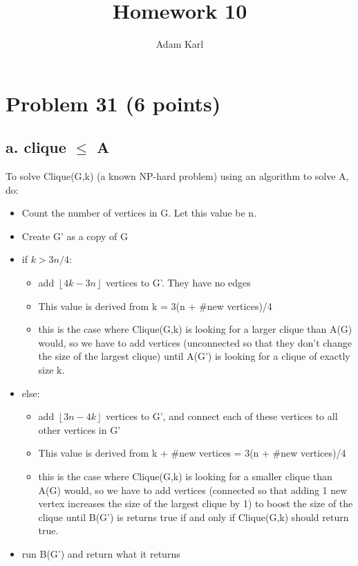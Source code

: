 \documentclass[a4paper]{article}
\title{Homework 10}
\author{Adam Karl}
\begin{document}
\maketitle

\section{Problem 31 (6 points)}
\subsection{a. clique $\leq$ A}
To solve Clique(G,k) (a known NP-hard problem) using an algorithm to solve A, do:

\begin{itemize}
    \item Count the number of vertices in G. Let this value be n.
    
    \item Create G' as a copy of G
    
    \item if $k > 3n/4$:
    \begin{itemize}
        \item add $\left\lfloor4k-3n\right\rfloor$ vertices to G'. They have no edges
        \item This value is derived from k = 3(n + #new vertices)/4
        \item this is the case where Clique(G,k) is looking for a larger clique than A(G) would, so we have to add vertices (unconnected so that they don't change the size of the largest clique) until A(G') is looking for a clique of exactly size k.
    \end{itemize}
    
    \item else:
    \begin{itemize}
        \item add $\left\lfloor3n-4k\right\rfloor$ vertices to G', and connect each of these vertices to all other vertices in G'
        \item This value is derived from k + #new vertices = 3(n + #new vertices)/4
        \item this is the case where Clique(G,k) is looking for a smaller clique than A(G) would, so we have to add vertices (connected so that adding 1 new vertex increases the size of the largest clique by 1) to boost the size of the clique until B(G') is returns true if and only if Clique(G,k) should return true.
    \end{itemize}
    \item run B(G') and return what it returns
\end{itemize}
\end{document}
